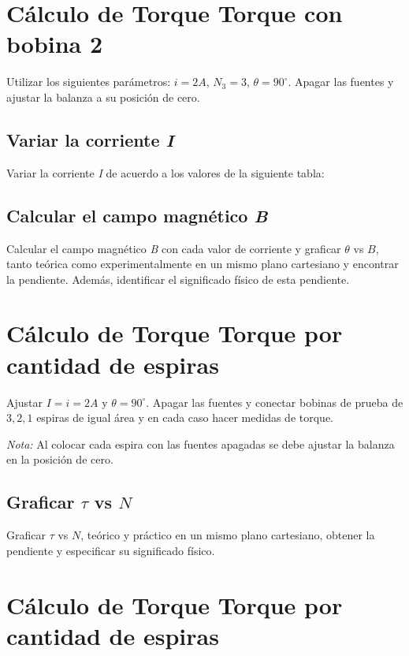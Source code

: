 \section{Cálculo de Torque Torque con bobina 2}

Utilizar los siguientes parámetros: $i = 2A$, $N_3 = 3$, $\theta = 90^{\circ}$.
Apagar las fuentes y ajustar la balanza a su posición de cero.

\subsection{Variar la corriente \textit{I}}

Variar la corriente \textit{I} de acuerdo a los valores de la siguiente tabla:


\subsection{Calcular el campo magnético \textit{B}}

Calcular el campo magnético \textit{B} con cada valor de corriente y graficar
$\theta$ vs $B$, tanto teórica como experimentalmente en un mismo
plano cartesiano y encontrar la pendiente. Además, identificar el
significado físico de esta pendiente.


\section{Cálculo de Torque Torque por cantidad de espiras}

Ajustar $I = i = 2A$ y $\theta = 90^{\circ}$. Apagar las fuentes y conectar
bobinas de prueba de $3, 2, 1$ espiras de igual área y en cada caso hacer
medidas de torque.

\textit{Nota:} Al colocar cada espira con las fuentes apagadas se debe ajustar
la balanza en la posición de cero.

\subsection{Graficar $\tau$ vs $N$}

Graficar $\tau$ vs $N$, teórico y práctico en un mismo plano cartesiano,
obtener la pendiente y especificar su significado físico.


\section{Cálculo de Torque Torque por cantidad de espiras}



